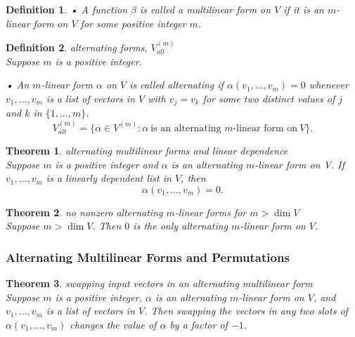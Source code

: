 \documentclass{article}
\newtheorem{theorem}{Theorem}[subsection]
\newtheorem{definition}{Definition}[subsection]
\begin{document}
\begin{CJK}{UTF8}{gkai}
\begin{definition}
    • A function $\beta$ is called a multilinear form on $V$ if it is an $m$-linear form on $V$ for some positive integer $m$.
\end{definition}

\begin{definition}
    alternating forms, $V^{(m)}_{alt}$\\

    Suppose $m$ is a positive integer.

    • An $m$-linear form $\alpha$ on $V$ is called alternating if $\alpha(v_1,\ldots,v_m) = 0$ whenever $v_1, \ldots,v_m$ is a list of vectors in $V$ with $v_j = v_k$ for some two distinct values of $j$ and $k$ in $\{1,\ldots,m\}$.
    \[V^{(m)}_{alt} = \{\alpha \in V^{(m)} : \alpha ~\text{is an alternating $m$-linear form on}~ V\}.\]
\end{definition}

\begin{theorem}
    alternating multilinear forms and linear dependence\\

    Suppose $m$ is a positive integer and $\alpha$ is an alternating $m$-linear form on V. If $v_1, \ldots,v_m$ is a linearly dependent list in $V$, then
    \[\alpha(v_1, \ldots,v_m) = 0.\]
\end{theorem}

\begin{theorem}
    no nonzero alternating $m$-linear forms for $m > \dim V$\\

    Suppose $m > \dim V$. Then $0$ is the only alternating $m$-linear form on $V$.
\end{theorem}

\subsubsection{Alternating Multilinear Forms and Permutations}

\begin{theorem}
    swapping input vectors in an alternating multilinear form\\

    Suppose $m$ is a positive integer, $\alpha$ is an alternating $m$-linear form on $V$, and $v_1, \ldots,v_m$ is a list of vectors in $V$. Then swapping the vectors in any two slots of $\alpha(v_1,\ldots,v_m)$ changes the value of $\alpha$ by a factor of $-1$.
\end{theorem}


\end{CJK}
\end{document}
